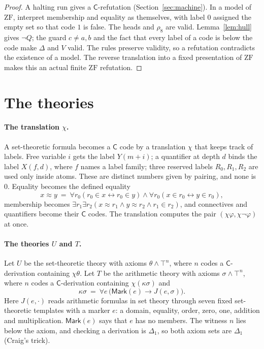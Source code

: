 \documentclass[11pt,letterpaper]{article}
\newcommand{\ZF}{\mathrm{ZF}}
\newcommand{\Cc}{\mathsf{C}}
\newcommand{\mk}{\mathsf{Mark}}
\begin{document}
\begin{proof}
A halting run gives a $\Cc$-refutation (Section~\ref{sec:machine}). In a
model of $\ZF$, interpret membership and equality as themselves, with
label $0$ assigned the empty set so that code $1$ is false. The heads and
$\rho_8$ are valid. Lemma~\ref{lem:hull} gives $\neg Q$; the guard
$c\ne a,b$ and the fact that every label of a code is below the code make
$\Delta$ and $V$ valid. The rules preserve validity, so a refutation
contradicts the existence of a model. The reverse translation into a
fixed presentation of $\ZF$ makes this an actual finite $\ZF$ refutation.
\end{proof}

\section{The theories}\label{sec:theories}

\paragraph{The translation $\chi$.}
A set-theoretic formula becomes a $\Cc$ code by a translation $\chi$ that
keeps track of labels. Free variable $i$ gets the label $Y(m+i)$; a
quantifier at depth $d$ binds the label $X(f,d)$, where $f$ names a label
family; three reserved labels $R_0,R_1,R_2$ are used only inside atoms.
These are distinct numbers given by pairing, and none is $0$. Equality
becomes the defined equality
\[
 x\approx y\ =\ \forall r_0(r_0\in x\leftrightarrow r_0\in y)\wedge
                \forall r_0(x\in r_0\leftrightarrow y\in r_0),
\]
membership becomes $\exists r_1\exists r_2(x\approx r_1\wedge y\approx r_2
\wedge r_1\in r_2)$, and connectives and quantifiers become their $\Cc$
codes. The translation computes the pair $(\chi\varphi,\chi\neg\varphi)$
at once.

\paragraph{The theories $U$ and $T$.}
Let $U$ be the set-theoretic theory with axioms $\theta\wedge\top^n$, where
$n$ codes a $\Cc$-derivation containing $\chi\theta$. Let $T$ be the
arithmetic theory with axioms $\sigma\wedge\top^n$, where $n$ codes a
$\Cc$-derivation containing $\chi(\kappa\sigma)$ and
\[
 \kappa\sigma\ =\ \forall e\,\bigl(\mk(e)\to J(e,\sigma)\bigr).
\]
Here $J(e,\cdot)$ reads arithmetic formulas in set theory through seven
fixed set-theoretic templates with a marker $e$: a domain, equality, order,
zero, one, addition and multiplication. $\mk(e)$ says that $e$ has no
members. The witness $n$ lies below the axiom, and checking a derivation
is $\Delta_1$, so both axiom sets are $\Delta_1$ (Craig's trick).
\end{document}

